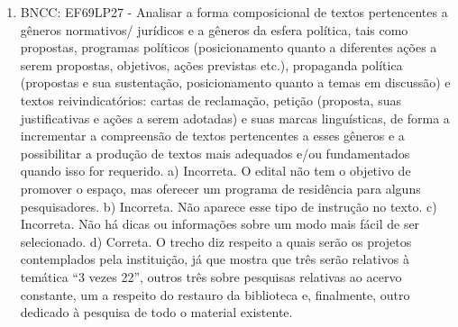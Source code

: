 \begin{enumerate}
\item
BNCC: EF69LP27 - Analisar a forma composicional de textos pertencentes a
gêneros normativos/ jurídicos e a gêneros da esfera política, tais como
propostas, programas políticos (posicionamento quanto a diferentes ações
a serem propostas, objetivos, ações previstas etc.), propaganda política
(propostas e sua sustentação, posicionamento quanto a temas em
discussão) e textos reivindicatórios: cartas de reclamação, petição
(proposta, suas justificativas e ações a serem adotadas) e suas marcas
linguísticas, de forma a incrementar a compreensão de textos
pertencentes a esses gêneros e a possibilitar a produção de textos mais
adequados e/ou fundamentados quando isso for requerido. a) Incorreta. O edital não tem o objetivo de promover o espaço, mas oferecer um programa de residência para alguns pesquisadores. b) Incorreta. Não aparece esse tipo de instrução no texto. c) Incorreta. Não há dicas ou informações sobre um modo mais fácil de ser selecionado. d) Correta. O trecho diz respeito a quais serão os projetos contemplados pela instituição, já que mostra que três serão relativos à temática ``3 vezes 22'', outros três sobre pesquisas relativas ao acervo constante, um a respeito do restauro da biblioteca e, finalmente, outro dedicado à pesquisa de todo o material existente.
\end{enumerate}


